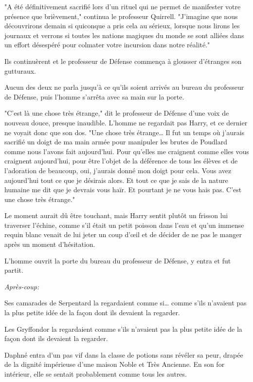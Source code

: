 "A été définitivement sacrifié lors d'un rituel qui ne permet de manifester votre présence que brièvement," continua le professeur Quirrell. "J'imagine que nous découvrirons demain si quiconque a pris cela au sérieux, lorsque nous lirons les journaux et verrons si toutes les nations magiques du monde se sont alliées dans un effort désespéré pour colmater votre incursion dans notre réalité."

Ils continuèrent et le professeur de Défense commença à glousser d'étranges son gutturaux.

Aucun des deux ne parla jusqu'à ce qu'ils soient arrivés au bureau du professeur de Défense, puis l'homme s'arrêta avec sa main sur la porte.

"C'est là une chose très étrange," dit le professeur de Défense d'une voix de nouveau douce, presque inaudible. L'homme ne regardait pas Harry, et ce dernier ne voyait donc que son dos. "Une chose très étrange… Il fut un temps où j'aurais sacrifié un doigt de ma main armée pour manipuler les brutes de Poudlard comme nous l'avons fait aujourd'hui. Pour qu'elles me craignent comme elles vous craignent aujourd'hui, pour être l'objet de la déférence de tous les élèves et de l'adoration de beaucoup, oui, j'aurais donné mon doigt pour cela. Vous avez aujourd'hui tout ce que je désirais alors. Et tout ce que je sais de la nature humaine me dit que je devrais vous haïr. Et pourtant je ne vous hais pas. C'est une chose très étrange."

Le moment aurait dû être touchant, mais Harry sentit plutôt un frisson lui traverser l'échine, comme s'il était un petit poisson dans l'eau et qu'un immense requin blanc venait de lui jeter un coup d'œil et de décider de ne pas le manger après un moment d'hésitation.

L'homme ouvrit la porte du bureau du professeur de Défense, y entra et fut partit.

\later

\emph{Après-coup:}

Ses camarades de Serpentard la regardaient comme si… comme s'ils n'avaient pas la plus petite idée de la façon dont ils devaient la regarder.

Les Gryffondor la regardaient comme s'ils n'avaient pas la plus petite idée de la façon dont ils devaient la regarder.

Daphné entra d'un pas vif dans la classe de potions sans révéler sa peur, drapée de la dignité impérieuse d'une maison Noble et Très Ancienne. En son for intérieur, elle se sentait probablement comme tous les autres.

